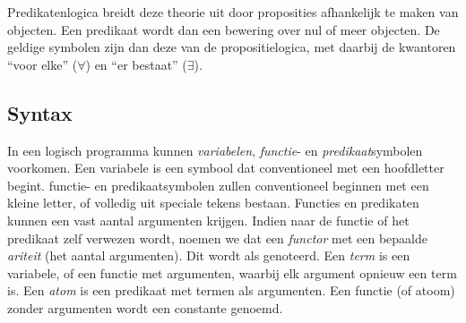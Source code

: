 Predikatenlogica breidt deze theorie uit door proposities afhankelijk te maken van objecten. Een predikaat wordt dan een bewering over nul of meer objecten. De geldige symbolen zijn dan deze van de propositielogica, met daarbij de kwantoren ``voor elke'' ($\forall$) en ``er bestaat'' ($\exists$).

\subsection{Syntax}

In een logisch programma kunnen {\em variabelen}, {\em functie}- en {\em predikaat}symbolen voorkomen. Een variabele is een symbool dat conventioneel met een hoofdletter begint. functie- en predikaatsymbolen zullen conventioneel beginnen met een kleine letter, of volledig uit speciale tekens bestaan. Functies en predikaten kunnen een vast aantal argumenten krijgen. Indien naar de functie of het predikaat zelf verwezen wordt, noemen we dat een {\em functor} met een bepaalde {\em ariteit} (het aantal argumenten). Dit wordt als  genoteerd. Een {\em term} is een variabele, of een functie met argumenten, waarbij elk argument opnieuw een term is. Een {\em atom} is een predikaat met termen als argumenten. Een functie (of atoom) zonder argumenten wordt een constante genoemd.

